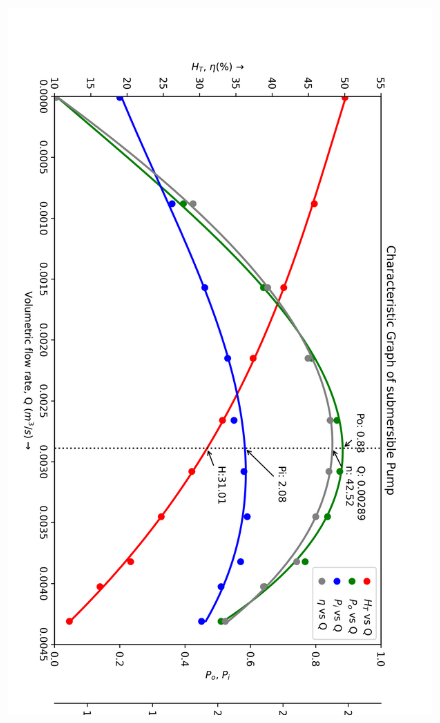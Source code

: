 \documentclass[12pt]{article}
\begin{document}
\pagebreak
\begin{figure}[h]
  \begin{center}
    \includegraphics*[width=0.89\linewidth]{img/exp_3a.png}
  \end{center}
\end{figure}
\end{document}
